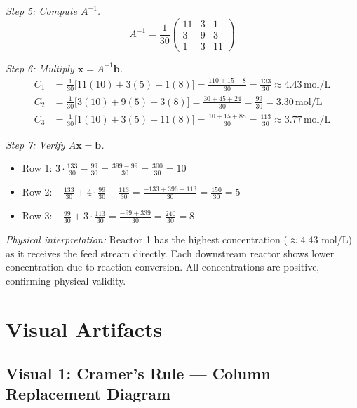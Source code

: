 \documentclass[12pt,a4paper]{article}
\begin{document}
\textit{Step 5: Compute \(A^{-1}\).}
\[
A^{-1} = \frac{1}{30}\begin{pmatrix}11&3&1\\3&9&3\\1&3&11\end{pmatrix}
\]

\textit{Step 6: Multiply \(\mathbf{x} = A^{-1}\mathbf{b}\).}
\begin{align*}
C_1 &= \frac{1}{30}\bigl[11(10)+3(5)+1(8)\bigr] = \frac{110+15+8}{30} = \frac{133}{30} \approx 4.43\,\text{mol/L} \\
C_2 &= \frac{1}{30}\bigl[3(10)+9(5)+3(8)\bigr] = \frac{30+45+24}{30} = \frac{99}{30} = 3.30\,\text{mol/L} \\
C_3 &= \frac{1}{30}\bigl[1(10)+3(5)+11(8)\bigr] = \frac{10+15+88}{30} = \frac{113}{30} \approx 3.77\,\text{mol/L}
\end{align*}

\textit{Step 7: Verify \(A\mathbf{x} = \mathbf{b}\).}
\begin{itemize}[noitemsep]
  \item Row 1: \(3\!\cdot\!\tfrac{133}{30} - \tfrac{99}{30} = \tfrac{399-99}{30} = \tfrac{300}{30} = 10\) \checkmark
  \item Row 2: \(-\tfrac{133}{30} + 4\!\cdot\!\tfrac{99}{30} - \tfrac{113}{30} = \tfrac{-133+396-113}{30} = \tfrac{150}{30} = 5\) \checkmark
  \item Row 3: \(-\tfrac{99}{30} + 3\!\cdot\!\tfrac{113}{30} = \tfrac{-99+339}{30} = \tfrac{240}{30} = 8\) \checkmark
\end{itemize}

\textit{Physical interpretation:} Reactor 1 has the highest concentration (\(\approx 4.43\) mol/L) as it receives the feed stream directly. Each downstream reactor shows lower concentration due to reaction conversion. All concentrations are positive, confirming physical validity.

\section{Visual Artifacts}

\subsection*{Visual 1: Cramer's Rule --- Column Replacement Diagram}
\end{document}
